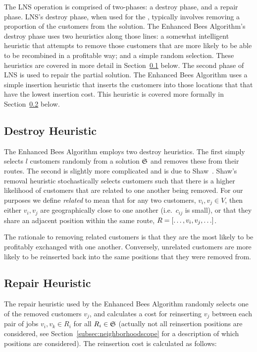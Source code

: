 The LNS operation is comprised of two-phases: a destroy phase, and a repair phase. LNS's destroy phase, when used for the \VRP, typically involves removing a proportion of the customers from the solution. The Enhanced Bees Algorithm's destroy phase uses two heuristics along those lines: a somewhat intelligent heuristic that attempts to remove those customers that are more likely to be able to be recombined in a profitable way; and a simple random selection. These heuristics are covered in more detail in Section~\ref{subsec:destroyheuristic} below. The second phase of LNS is used to repair the partial solution. The Enhanced Bees Algorithm uses a simple insertion heuristic that inserts the customers into those locations that that have the lowest insertion cost. This heuristic is covered more formally in Section~\ref{subsec:repairheuristic} below.

\subsection{Destroy Heuristic}
\label{subsec:destroyheuristic}

The Enhanced Bees Algorithm employs two destroy heuristics. The first simply selects $l$ customers randomly from a solution $\mathfrak{S}$ and removes these from their routes. The second is slightly more complicated and is due to Shaw~\cite{Shaw:1998}. Shaw's removal heuristic stochastically selects customers such that there is a higher likelihood of customers that are related to one another being removed. For our purposes we define \emph{related} to mean that for any two customers, $v_i, v_j \in V$, then either $v_i, v_j$ are geographically close to one another (i.e.~$c_{ij}$ is small), or that they share an adjacent position within the same route, $R = [\ldots, v_i, v_j,\ldots]$.

The rationale to removing related customers is that they are the most likely to be profitably exchanged with one another. Conversely, unrelated customers are more likely to be reinserted back into the same positions that they were removed from. 

\subsection{Repair Heuristic}
\label{subsec:repairheuristic}

The repair heuristic used by the Enhanced Bees Algorithm randomly selects one of the removed customers $v_j$, and calculates a cost for reinserting $v_j$ between each pair of jobs $v_i, v_k \in R_i$ for all $R_i \in \mathfrak{S}$ (actually not all reinsertion positions are considered, see Section~\ref{subsec:neighborhoodscope} for a description of which positions are considered). The reinsertion cost is calculated as follows:

